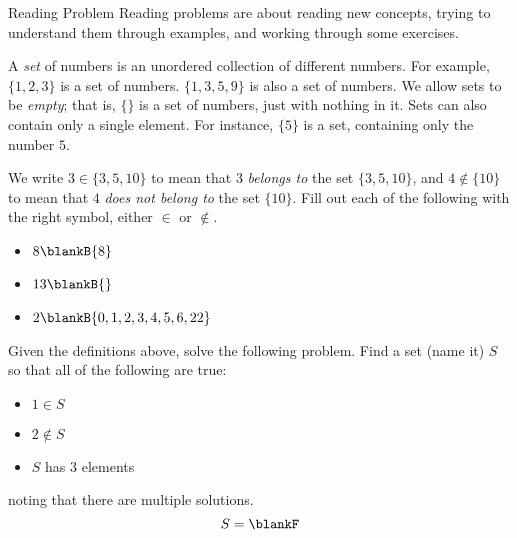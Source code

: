 \documentclass[14pt,letterpaper]{article}
\begin{document}
\begin{problem}{Reading Problem}
  Reading problems are about reading new concepts, trying to understand them
  through examples, and working through some exercises.

  A \emph{set} of numbers is an unordered collection of different numbers. For
  example, \(\{1, 2, 3\}\) is a set of numbers. \(\{1, 3, 5, 9\}\) is also a
  set of numbers. We allow sets to be \emph{empty}; that is, \(\{\}\) is a set
  of numbers, just with nothing in it. Sets can also contain only a single
  element. For instance, \(\{5\}\) is a set, containing only the number \(5\).

  We write \(3 \in \{3, 5, 10\}\) to mean that \(3\) \emph{belongs to} the set
  \(\{3, 5, 10\}\), and \(4 \notin \{10\}\) to mean that \(4\) \emph{does not
  belong to} the set \(\{10\}\). Fill out each of the following with the right
  symbol, either \(\in\) or \(\notin\). \begin{itemize}
    \item \(8 \blankB \{8\}\)
    \item \(13 \blankB \{\}\)
    \item \(2 \blankB \{0, 1, 2, 3, 4, 5, 6, 22\}\)
  \end{itemize}

  Given the definitions above, solve the following problem. Find a set (name
  it) \(S\) so that all of the following are true: \begin{itemize}
    \item \(1 \in S\)
    \item \(2 \notin S\)
    \item \(S\) has \(3\) elements
  \end{itemize}
  noting that there are multiple solutions. \[
    S = \blankF
  \]
\end{problem}
\end{document}
